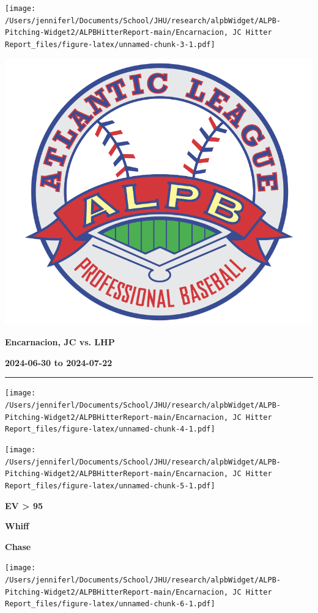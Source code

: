 \documentclass[
]{article}
\begin{document}
\texttt{[image: /Users/jenniferl/Documents/School/JHU/research/alpbWidget/ALPB-Pitching-Widget2/ALPBHitterReport-main/Encarnacion, JC Hitter Report\_files/figure-latex/unnamed-chunk-3-1.pdf]}

\newpage
\begin{multicols}{3}

\includegraphics[width=0.4\columnwidth]{ALPB_Logo}

\hspace{0pt}
\vfill
\hspace{-0.5in}\large\textbf{Encarnacion, JC vs. LHP}
\vfill
\hspace{0pt}

\hspace{0pt}
\vfill
\large\textbf{2024-06-30 to 2024-07-22}
\vfill
\hspace{0pt}

\end{multicols}
\vspace{-0.35in}

\noindent

\rule{\textwidth}{0.75pt}

\texttt{[image: /Users/jenniferl/Documents/School/JHU/research/alpbWidget/ALPB-Pitching-Widget2/ALPBHitterReport-main/Encarnacion, JC Hitter Report\_files/figure-latex/unnamed-chunk-4-1.pdf]}

\texttt{[image: /Users/jenniferl/Documents/School/JHU/research/alpbWidget/ALPB-Pitching-Widget2/ALPBHitterReport-main/Encarnacion, JC Hitter Report\_files/figure-latex/unnamed-chunk-5-1.pdf]}

\begin{multicols}{3}



\hspace{0.2in}\centerline{\LARGE\textbf{EV > 95}}



\hspace{-0.05in}\centerline{\LARGE\textbf{Whiff}}



\hspace{-0.05in}\centerline{\LARGE\textbf{Chase}}
\end{multicols}

\texttt{[image: /Users/jenniferl/Documents/School/JHU/research/alpbWidget/ALPB-Pitching-Widget2/ALPBHitterReport-main/Encarnacion, JC Hitter Report\_files/figure-latex/unnamed-chunk-6-1.pdf]}
\end{document}

